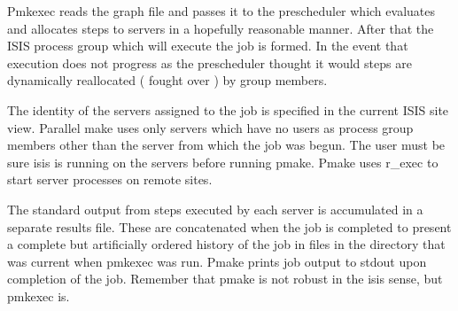 Pmkexec reads the graph file and passes it to the prescheduler which
evaluates and allocates steps to servers in a hopefully reasonable manner.
After that the ISIS process group which will execute the job is formed.  In the
event that execution does not progress as the prescheduler thought it would
steps are dynamically reallocated ( fought over ) by group members.
 
The identity of the servers assigned to the job is specified in the current
ISIS site view.  Parallel make uses only servers which have no users as
process group members other than the server from which the job was begun.
The user must be sure isis is running on the servers before running pmake.
Pmake uses r\_exec to start server processes on remote sites.
 
The standard output from steps executed by each server is accumulated in a
separate results file.  These are concatenated when the job is completed to
present a complete but artificially ordered history of the job in files in the
directory that was current when pmkexec was run.  Pmake prints job output to
stdout upon completion of the job.  Remember that pmake is not robust in the
isis sense, but pmkexec is.


